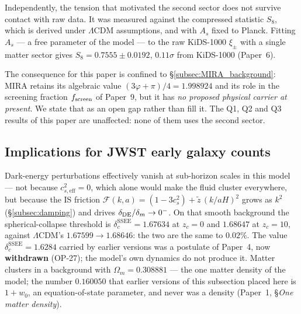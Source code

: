\documentclass[12pt,a4paper]{article}
\begin{document}
Independently, the tension that motivated the second sector does not survive
contact with raw data.  It was measured against the compressed statistic $S_8$,
which is derived under $\Lambda$CDM assumptions, and with $A_s$ fixed to
Planck.  Fitting $A_s$ --- a free parameter of the model --- to the raw
KiDS-1000 $\xi_\pm$ with a single matter sector gives
$S_8 = 0.7555\pm0.0192$, $0.11\sigma$ from KiDS-1000 (Paper~6).

The consequence for this paper is confined to \S\ref{subsec:MIRA_background}:
$\mathrm{MIRA}$ retains its algebraic value $(3\varphi+\pi)/4 = 1.998924$ and
its role in the screening fraction $f_{\rm screen}$ of Paper~9, but it has
\emph{no proposed physical carrier at present}.  We state that as an open gap
rather than fill it.  The Q1, Q2 and Q3 results of this paper are unaffected:
none of them uses the second sector.

\subsection{Implications for JWST early galaxy counts}
\label{subsec:JWST}

Dark-energy perturbations effectively vanish at sub-horizon scales in this
model --- not because $c^2_{s,\mathrm{eff}}=0$, which alone would make the
fluid cluster everywhere, but because the IS friction
$\mathcal{F}(k,a)=(1-3c_s^2)+\tilde z\,(k/aH)^2$ grows as $k^2$
(\S\ref{subsec:damping}) and drives $\delta_{\rm DE}/\delta_m\to0^-$.
On that smooth background the spherical-collapse threshold is
$\delta_c^{\mathrm{SSEE}} = 1.67634$ at $z_c=0$ and $1.68647$ at $z_c=10$,
against $\Lambda$CDM's $1.67599 \to 1.68646$: the two are the same to
$0.02\%$. The value $\delta_c^{\mathrm{SSEE}}=1.6284$ carried by earlier
versions was a postulate of Paper~4, now \textbf{withdrawn} (OP-27); the
model's own dynamics do not produce it. Matter
clusters in a background with $\Omega_m = 0.308881$ --- the one matter density
of the model; the number $0.160050$ that earlier versions of this subsection
placed here is $1+w_0$, an equation-of-state parameter, and never was a
density (Paper~1, \S\emph{One matter density}).
\end{document}
